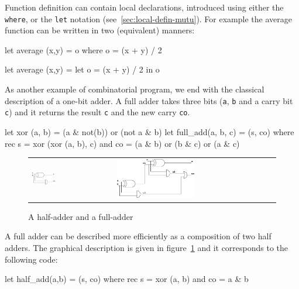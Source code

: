 \documentclass[11pt,titlepage,twoside]{report}
\begin{document}
Function definition can contain local declarations, introduced using
either the {\tt where}, or the {\tt let} notation
(see~\ref{sec:local-defin-mutu}). For example the average function can
be written in two (equivalent) manners:
\begin{runverbatim}
let average (x,y) = o where o = (x + y) / 2
\end{runverbatim}
\begin{runverbatim}
let average (x,y) = let o = (x + y) / 2 in o
\end{runverbatim}

As another example of combinatorial program, we end with the classical
description of a one-bit adder. A full adder takes three bits
(\verb-a-, \verb-b- and a carry bit \verb-c-) and it returns the
result \verb-c- and the new carry \verb-co-.
\begin{runverbatim}[withresult,label=xor]
let xor (a, b) = (a & not(b)) or (not a & b)
let full_add(a, b, c) = (s, co) where
   rec s = xor (xor (a, b), c)
   and co = (a & b) or (b & c) or (a & c)
\end{runverbatim}

\begin{figure}
\begin{center}
\begin{tabular}{ll}
\includegraphics[width=0.3\textwidth]{Fig/half_adder}
& \quad\quad
\includegraphics[width=0.5\textwidth]{Fig/full_adder}
\end{tabular}
\end{center}
\caption{A half-adder and a full-adder~\label{half-adder}}
\end{figure}

A full adder can be described more efficiently as a composition
of two half adders. The graphical description is given in
figure~\ref{half-adder} and it corresponds to the following code:
\begin{runverbatim}
let half_add(a,b) = (s, co) where
   rec s = xor (a, b)
   and co = a & b
\end{runverbatim}
\end{document}
